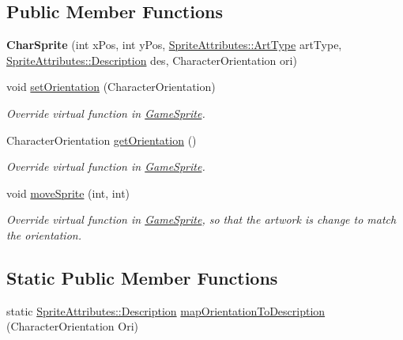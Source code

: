 \subsection*{Public Member Functions}
\begin{DoxyCompactItemize}
\item 
\mbox{\label{class_char_sprite_af37365a1d2728992c4ea4614f7cefe80}} 
{\bfseries Char\+Sprite} (int x\+Pos, int y\+Pos, \mbox{\hyperlink{namespace_sprite_attributes_afb5447c311bc29f0ce8ddfd025c6e998}{Sprite\+Attributes\+::\+Art\+Type}} art\+Type, \mbox{\hyperlink{namespace_sprite_attributes_a3ece96d6288b14d53d84e2138392395c}{Sprite\+Attributes\+::\+Description}} des, Character\+Orientation ori)
\item 
\mbox{\label{class_char_sprite_aa1abdd6c5c23e4f9fc387c6366e614f4}} 
void \mbox{\hyperlink{class_char_sprite_aa1abdd6c5c23e4f9fc387c6366e614f4}{set\+Orientation}} (Character\+Orientation)
\begin{DoxyCompactList}\small\item\em Override virtual function in \mbox{\hyperlink{class_game_sprite}{Game\+Sprite}}. \end{DoxyCompactList}\item 
\mbox{\label{class_char_sprite_a90884802c77985e34839c8c65f31e130}} 
Character\+Orientation \mbox{\hyperlink{class_char_sprite_a90884802c77985e34839c8c65f31e130}{get\+Orientation}} ()
\begin{DoxyCompactList}\small\item\em Override virtual function in \mbox{\hyperlink{class_game_sprite}{Game\+Sprite}}. \end{DoxyCompactList}\item 
\mbox{\label{class_char_sprite_ac4d0cb62e37461baff3fa1aa31de5878}} 
void \mbox{\hyperlink{class_char_sprite_ac4d0cb62e37461baff3fa1aa31de5878}{move\+Sprite}} (int, int)
\begin{DoxyCompactList}\small\item\em Override virtual function in \mbox{\hyperlink{class_game_sprite}{Game\+Sprite}}, so that the artwork is change to match the orientation. \end{DoxyCompactList}\end{DoxyCompactItemize}
\subsection*{Static Public Member Functions}
\begin{DoxyCompactItemize}
\item 
static \mbox{\hyperlink{namespace_sprite_attributes_a3ece96d6288b14d53d84e2138392395c}{Sprite\+Attributes\+::\+Description}} \mbox{\hyperlink{class_char_sprite_a7556b4b4123dbd51b13ec46fc11c0810}{map\+Orientation\+To\+Description}} (Character\+Orientation Ori)
\end{DoxyCompactItemize}


